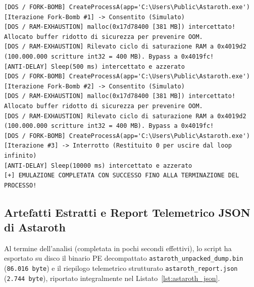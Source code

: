 \documentclass[11pt, a4paper]{article}
\begin{document}
\noindent\begin{minipage}{\linewidth}
\begin{lstlisting}[style=consoleout, caption={Esecuzione controllata delle iterazioni Fork-Bomb/RAM-Exhaustion e completamento naturale del processo.}, label={lst:astaroth_dos_out}]
[DOS / FORK-BOMB] CreateProcessA(app='C:\Users\Public\Astaroth.exe') [Iterazione Fork-Bomb #1] -> Consentito (Simulato)
[DOS / RAM-EXHAUSTION] malloc(0x17d78400 [381 MB]) intercettato! Allocato buffer ridotto di sicurezza per prevenire OOM.
[DOS / RAM-EXHAUSTION] Rilevato ciclo di saturazione RAM a 0x4019d2 (100.000.000 scritture int32 = 400 MB). Bypass a 0x4019fc!
[ANTI-DELAY] Sleep(500 ms) intercettato e azzerato
[DOS / FORK-BOMB] CreateProcessA(app='C:\Users\Public\Astaroth.exe') [Iterazione Fork-Bomb #2] -> Consentito (Simulato)
[DOS / RAM-EXHAUSTION] malloc(0x17d78400 [381 MB]) intercettato! Allocato buffer ridotto di sicurezza per prevenire OOM.
[DOS / RAM-EXHAUSTION] Rilevato ciclo di saturazione RAM a 0x4019d2 (100.000.000 scritture int32 = 400 MB). Bypass a 0x4019fc!
[DOS / FORK-BOMB] CreateProcessA(app='C:\Users\Public\Astaroth.exe') [Iterazione #3] -> Interrotto (Restituito 0 per uscire dal loop infinito)
[ANTI-DELAY] Sleep(10000 ms) intercettato e azzerato
[+] EMULAZIONE COMPLETATA CON SUCCESSO FINO ALLA TERMINAZIONE DEL PROCESSO!
\end{lstlisting}
\end{minipage}


\subsection{Artefatti Estratti e Report Telemetrico JSON di Astaroth}

Al termine dell'analisi (completata in pochi secondi effettivi), lo script ha esportato su disco il binario PE decompattato \texttt{astaroth\_\allowbreak{}unpacked\_\allowbreak{}dump.\allowbreak{}bin} (\texttt{86.016 byte}) e il riepilogo telemetrico strutturato \texttt{astaroth\_\allowbreak{}report.\allowbreak{}json} (\texttt{2.744 byte}), riportato integralmente nel Listato~\ref{lst:astaroth_json}.
\end{document}

